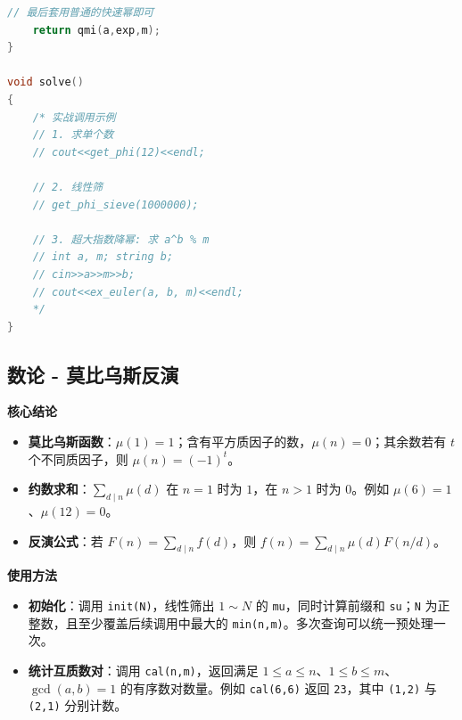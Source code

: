 \documentclass[10pt,landscape,a4paper]{article}
\begin{document}
\begin{multicols*}{3}
\begin{lstlisting}[language=C++]
    // 最后套用普通的快速幂即可
    return qmi(a,exp,m); 
}

void solve()
{
    /* 实战调用示例
    // 1. 求单个数
    // cout<<get_phi(12)<<endl; 
    
    // 2. 线性筛
    // get_phi_sieve(1000000); 
    
    // 3. 超大指数降幂: 求 a^b % m
    // int a, m; string b;
    // cin>>a>>m>>b;
    // cout<<ex_euler(a, b, m)<<endl;
    */
}
\end{lstlisting}
\subsection*{数论 - 莫比乌斯反演}
\par\addvspace{0.7ex}\noindent\textbf{核心结论}\par\nobreak
\begin{itemize}
\item \textbf{莫比乌斯函数}：$\mu(1)=1$；含有平方质因子的数，$\mu(n)=0$；其余数若有 $t$ 个不同质因子，则 $\mu(n)=(-1)^t$。
\item \textbf{约数求和}：$\sum_{d\mid n}\mu(d)$ 在 $n=1$ 时为 $1$，在 $n>1$ 时为 $0$。例如 $\mu(6)=1$、$\mu(12)=0$。
\item \textbf{反演公式}：若 $F(n)=\sum_{d\mid n}f(d)$，则 $f(n)=\sum_{d\mid n}\mu(d)F(n/d)$。
\end{itemize}
\par\addvspace{0.7ex}\noindent\textbf{使用方法}\par\nobreak
\begin{itemize}
\item \textbf{初始化}：调用 \texttt{i\allowbreak{}n\allowbreak{}i\allowbreak{}t\allowbreak{}(\allowbreak{}N\allowbreak{})}，线性筛出 $1\sim N$ 的 \texttt{m\allowbreak{}u}，同时计算前缀和 \texttt{s\allowbreak{}u}；\texttt{N} 为正整数，且至少覆盖后续调用中最大的 \texttt{m\allowbreak{}i\allowbreak{}n\allowbreak{}(\allowbreak{}n\allowbreak{},\allowbreak{}m\allowbreak{})}。多次查询可以统一预处理一次。
\item \textbf{统计互质数对}：调用 \texttt{c\allowbreak{}a\allowbreak{}l\allowbreak{}(\allowbreak{}n\allowbreak{},\allowbreak{}m\allowbreak{})}，返回满足 $1\le a\le n$、$1\le b\le m$、$\gcd(a,b)=1$ 的有序数对数量。例如 \texttt{c\allowbreak{}a\allowbreak{}l\allowbreak{}(\allowbreak{}6\allowbreak{},\allowbreak{}6\allowbreak{})} 返回 \texttt{2\allowbreak{}3}，其中 \texttt{(\allowbreak{}1\allowbreak{},\allowbreak{}2\allowbreak{})} 与 \texttt{(\allowbreak{}2\allowbreak{},\allowbreak{}1\allowbreak{})} 分别计数。

\end{itemize}
\end{multicols*}
\end{document}
